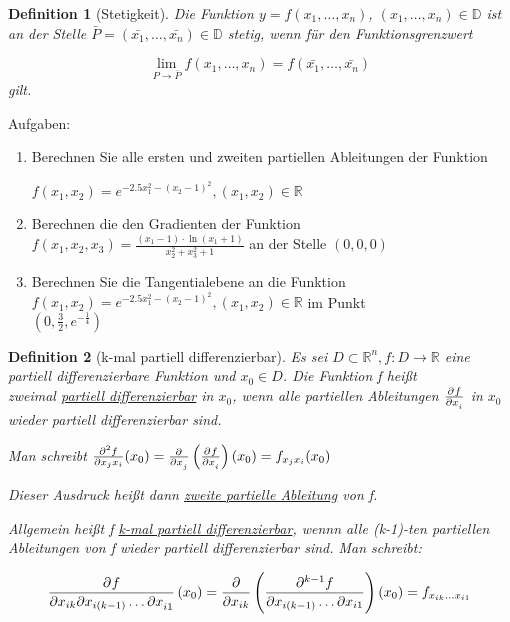\documentclass[fontset=ubuntu,12pt,a4paper]{scrreprt}
\newtheorem{defi}{Definition}[section]
\begin{document}
\begin{defi}[Stetigkeit]
    Die Funktion \(y=f(x_1,\dots,x_n)\), \((x_1,\dots,x_n)\in\mathbb{D}\) ist an der Stelle \(\bar{P}=(\bar{x_1},\dots,\bar{x_n}) \in \mathbb{D}\) stetig, wenn für den Funktionsgrenzwert
    
    \[\lim_{P\to\bar{P}}{f(x_1,\dots,x_n)} = f(\bar{x_1},\dots,\bar{x_n})\] gilt.
\end{defi}

Aufgaben:

\begin{enumerate}
    \item Berechnen Sie alle ersten und zweiten partiellen Ableitungen der Funktion
    
    \(f(x_1,x_2)=e^{-2.5x_1^2-{(x_2-1)}^2}, (x_1,x_2) \in \mathbb{R}\)
    \item Berechnen die den Gradienten der Funktion \(f(x_1,x_2,x_3)=\frac{(x_1-1)\cdot\ln(x_1+1)}{x_2^2+x_3^2+1}\) an der Stelle \((0,0,0)\)
    \item Berechnen Sie die Tangentialebene an die Funktion \\ \(f(x_1,x_2)=e^{-2.5x_1^2-{(x_2-1)}^2}, (x_1,x_2) \in \mathbb{R}\) im Punkt \\ \((0,\frac{3}{2},e^{-\frac{1}{4}})\)
\end{enumerate}

\begin{defi}[k-mal partiell differenzierbar]
    Es sei \(D\subset\mathbb{R}^n,f:D\to\mathbb{R}\) eine partiell differenzierbare Funktion und \(x_0 \in D\). Die Funktion f heißt \\ zweimal \underline{partiell differenzierbar} in \(x_0\), wenn alle partiellen Ableitungen \(\pd{f}{x_i}\) in \(x_0\) wieder partiell differenzierbar sind.

    Man schreibt \(\frac{\partial^2 f}{\partial x_j x_i}(x_0)=\pd{}{x_j}\left(\pd{f}{x_i}\right)(x_0)=f_{x_j x_i}(x_0)\)

    Dieser Ausdruck heißt dann \underline{zweite partielle Ableitung} von f.

    Allgemein heißt f \underline{k-mal partiell differenzierbar}, wennn alle (k-1)-ten partiellen Ableitungen von f wieder partiell differenzierbar sind. Man schreibt:

    \[\dpd{f}{x_{ik} \partial x_{i(k-1)} \dots \partial x_{i1}}(x_0) = \frac{\partial}{\partial x_{ik}}\left(\frac{\partial^{k-1} f}{\partial x_{i(k-1)} \dots \partial x_{i1}}\right)(x_0)=f_{x_{ik} \dots x_{i1}}\]
\end{defi}
\end{document}
